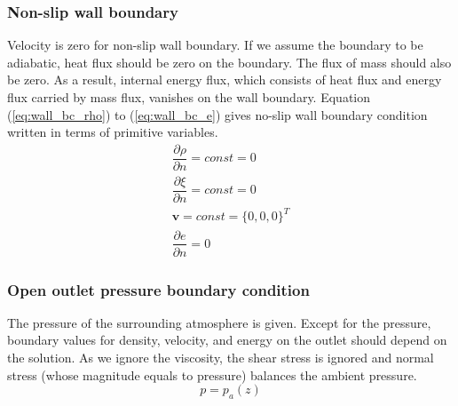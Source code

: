 \documentclass[journal abbreviation, manuscript]{copernicus}
\begin{document}
\subsubsection{Non-slip wall boundary}
Velocity is zero for non-slip wall boundary. If we assume the boundary to be adiabatic, heat flux should be zero on the boundary. The flux of mass should also be zero. As a result, internal energy flux, which consists of heat flux and energy flux carried by mass flux, vanishes on the wall boundary. Equation (\ref{eq:wall_bc_rho}) to (\ref{eq:wall_bc_e}) gives no-slip wall boundary condition written in terms of primitive variables.
\begin{align}
\dfrac{\partial \rho}{\partial n} = const = 0\label{eq:wall_bc_rho} \\
\dfrac{\partial \xi}{\partial n} = const = 0 \label{eq:wall_bc_xi}\\ 
\textbf{v} = const =\{0,0,0\}^T \label{eq:wall_bc_v}\\
\dfrac{\partial e }{\partial n} = 0\label{eq:wall_bc_e}
\end{align} 

\subsubsection{Open outlet pressure boundary condition}
The pressure of the surrounding atmosphere is given. Except for the pressure, boundary values for density, velocity, and energy on the outlet should depend on the solution. As we ignore the viscosity, the shear stress is ignored and normal stress (whose magnitude equals to pressure) balances the ambient pressure.
\begin{equation}
p = p_a\left(z\right)\label{eq:pressure_bc_p} 
\end{equation} 
\end{document}
